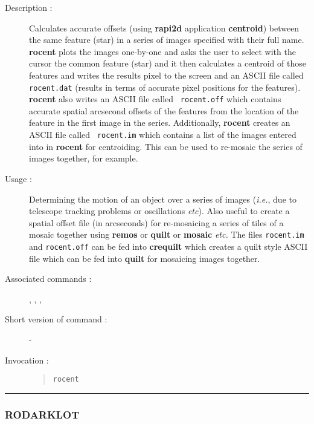 \begin{description}

\item[Description :] Calculates accurate offsets (using {\bf rapi2d}
application {\bf centroid}) between the same feature (star) in a series
of images specified with their full name.  {\bf rocent} plots the
images one-by-one and asks the user to select with the cursor the
common feature (star) and it then calculates a centroid of those
features and writes the results pixel to the screen and an ASCII file
called {\tt rocent.dat} (results in terms of accurate pixel positions
for the features). {\bf rocent} also writes an ASCII file called {\tt
rocent.off} which contains accurate spatial arcsecond offsets of the
features from the location of the feature in the first image in the
series.  Additionally, {\bf rocent} creates an ASCII file called {\tt
rocent.im} which contains a list of the images entered into in {\bf
rocent} for centroiding.  This can be used to re-mosaic the series of
images together, for example.

\item[Usage :] Determining the motion of an object
over a series of images (\emph{i.e.}, due to telescope tracking
problems or oscillations \emph{etc}).  Also useful to create a spatial
offset file (in arcseconds) for re-mosaicing a series of tiles of a
mosaic together using {\bf remos} or {\bf quilt} or {\bf mosaic}
\emph{etc.}  The files {\tt rocent.im} and {\tt rocent.off} can be fed
into {\bf crequilt} which creates a quilt style ASCII file which can be
fed into {\bf quilt} for mosaicing images together.

\item[Associated commands :] {\tt {}}, 
{\tt {}}, {\tt {}}, 
{\tt {}}

\item[Short version of command :] -
\item[Invocation :]

\begin{quote}{\tt  rocent }\end{quote}

\end{description}

\hrule 
\subsubsection*{\label{RODARKLOT}RODARKLOT}


